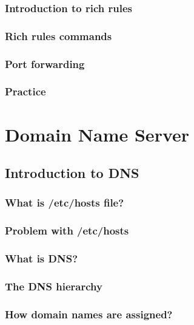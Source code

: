 \documentclass[14pt,fleqn]{extbook} %
\begin{document}
\subsection{Introduction to rich rules}

\subsection{Rich rules commands}

\subsection{Port forwarding}

\subsection{Practice}
%

\chapter{Domain Name Server}
\section{Introduction to DNS}

\subsection{What is /etc/hosts file?}

\subsection{Problem with /etc/hosts}

\subsection{What is DNS?}

\subsection{The DNS hierarchy}

\subsection{How domain names are assigned?}

\end{document}
